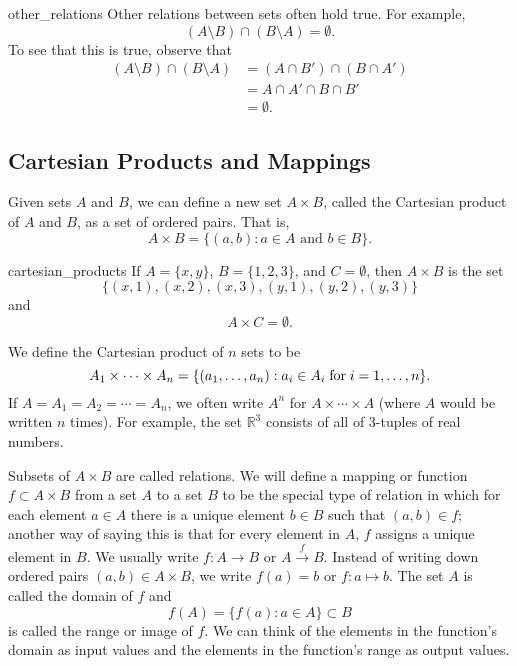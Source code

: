 \begin{example}{other_relations}
Other relations between sets often hold true.  For example,
\[
( A \setminus B) \cap (B \setminus A) = \emptyset.
\]
To see that this is true, observe that
\begin{align*}
( A \setminus B) \cap (B \setminus A)
& =
( A \cap B') \cap (B \cap A') \\
& =
A \cap A' \cap B \cap B' \\
& = \emptyset.
\end{align*}
\end{example}
 
 
\subsection*{Cartesian Products and Mappings}

Given sets $A$ and $B$, we can define a new set $A \times\label{cartesian} B$, called the {\bfi Cartesian product\/}  of $A$ and $B$, as a set of ordered pairs.  That is, 
\[
A \times B = \{ (a,b) : a \in A \text{ and } b \in B \}.
\]

 
\begin{example}{cartesian_products}
If $A = \{ x, y \}$, $B = \{ 1, 2, 3 \}$, and $C = \emptyset$, then $A \times B$ is the set 
\[
\{ (x, 1), (x, 2), (x, 3), (y, 1), (y, 2), (y, 3) \}
\]
and
\[
A \times C = \emptyset.
\]
\end{example}

We define the {\bfi Cartesian product of $n$ sets\/} to be
\[
A_1 \times \cdots \times A_n = \{ (a_1, \ldots, a_n): a_i \in A_i {\rm\; for\;} i = 1, \ldots, n \}.
\]
If $A = A_1 = A_2 = \cdots = A_n$, we often write $A^n$ for $A \times \cdots \times A$ (where $A$ would be written $n$ times)\label{ncartesian}.   For example, the set ${\mathbb R}^3$ consists of all of 3-tuples of real numbers.
 
Subsets of $A \times B$ are called {\bfi relations}.  We will define a  {\bfi mapping\/} or {\bfi function} $f \subset A \times B$ from a set $A$ to a set $B$ to be the special type of  relation in which for each element $a \in A$ there is a unique element $b \in B$ such that $(a, b) \in f$; another way of saying this is that for every element in $A$, $f$ assigns a unique element in $B$.  We usually write $f:A \rightarrow B$ or $A \stackrel{f}{\rightarrow} B$.  Instead of writing down ordered pairs  $(a,b) \in A \times B$, we write $f(a) = b$ or $f : a \mapsto b$.  The set  $A$ is called the {\bfi domain\/} of $f$ and   
\[
f(A) = \{ f(a) : a \in A \} \subset B
\]
is called the {\bfi range\/} or {\bfi image\/} of $f$.  We can think of the elements in the function's domain as input values and the elements in the function's range as output values.  
 
